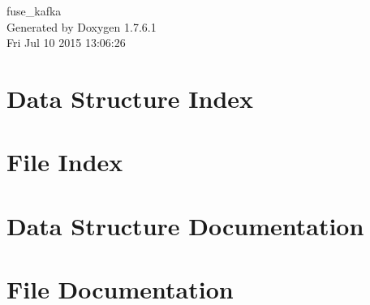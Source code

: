 \documentclass[a4paper]{book}
\begin{document}
\hypersetup{pageanchor=false,citecolor=blue}
\begin{titlepage}
\vspace*{7cm}
\begin{center}
{\Large fuse\-\_\-kafka }\\
\vspace*{1cm}
{\large \-Generated by Doxygen 1.7.6.1}\\
\vspace*{0.5cm}
{\small Fri Jul 10 2015 13:06:26}\\
\end{center}
\end{titlepage}
\clearemptydoublepage
{}
\tableofcontents
\clearemptydoublepage
{}
\hypersetup{pageanchor=true,citecolor=blue}
\chapter{\-Data \-Structure \-Index}

\chapter{\-File \-Index}

\chapter{\-Data \-Structure \-Documentation}




















\chapter{\-File \-Documentation}








\printindex
\end{document}
